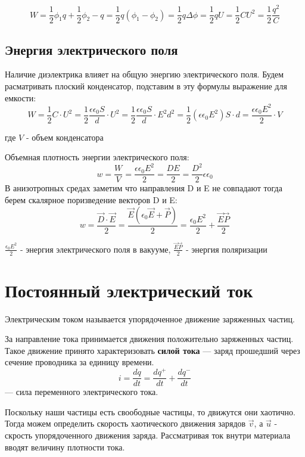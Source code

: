 \documentclass[../main.tex]{subfiles}
\begin{document}
\[ W = \frac{1}{2}\phi_1 q + \frac{1}{2}\phi_2 -q = \frac{1}{2}q (\phi_1 - \phi_2) = \frac{1}{2} q \Delta \phi
    = \frac{1}{2} q U = \frac{1}{2} C U^2 =\frac{1}{2} \frac{q^2}{C}\]
\subsection{Энергия электрического поля}
Наличие диэлектрика влияет на общую энергию электрического поля. Будем расматривать плоский конденсатор, подставим в эту формулы выражение для емкости:
\[ W = \frac{1}{2} C \cdot U^2 = \frac{1}{2} \frac{\epsilon \epsilon_0 S}{d} \cdot U^2 = \frac{1}{2} \frac{\epsilon \epsilon_0 S}{d} \cdot E^2 d^2 = \frac{1}{2}(\epsilon \epsilon_0 E^2) S \cdot d =
    \frac{\epsilon \epsilon_ 0 E^2}{2} \cdot V\]
\begin{center}
    где $V$ - объем конденсатора
\end{center}

Объемная плотность энергии электрического поля:
\[w = \frac{W}{V} = \frac{\epsilon \epsilon_ 0 E^2}{2} = \frac{D E}{2} = \frac{D^2}{2} \epsilon \epsilon_0\]
В анизотропных средах заметим что направления D и E не совпадают тогда берем скалярное поризведение векторов D и E:
\[w = \frac{\vec D \cdot \vec E}{2} = \frac{\vec E (\epsilon_0 \vec E + \vec P)}{2} = \frac{\epsilon_0 E^2}{2} + \frac{\vec E \vec P}{2}\]
\begin{center}
    $\frac{\epsilon_0 E^2}{2}$ - энергия электрического поля в вакууме,
    \newline
    $\frac{\vec E \vec P}{2}$ - энергия поляризации
\end{center}

\section{Постоянный электрический ток}

 Электрическим током называется упорядоченное движение заряженных частиц.

За направление тока принимается движения положительно заряженных частиц.
 Такое движение принято характеризовать \textbf{силой тока}  --- заряд прошедший через сечение проводника за единицу времени.
\[i = \frac{dq}{dt} = \frac{dq ^{+}}{dt} + \frac{dq ^{-}}{dt}\] --- сила переменного электрического тока.

Поскольку наши частицы есть своободные частицы, то движутся они хаотично. Тогда можем определить скорость хаотического движения зарядов $\vec v$,
а $\vec u$ - скрость упорядоченного движения заряда. Рассматривая ток внутри материала вводят величину плотности тока.
\end{document}
